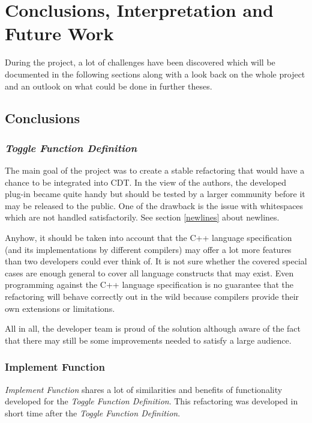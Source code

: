 \chapter{Conclusions, Interpretation and Future Work}
\thispagestyle{fancy}

During the project, a lot of challenges have been discovered which will be 
documented in the following sections along with a look back on the whole project 
and an outlook on what could be done in further theses. 

\section{Conclusions}

\subsection{\textit{Toggle Function Definition}}
The main goal of the project was to create a stable refactoring that would have 
a chance to be integrated into CDT. In the view of the authors, the developed 
plug-in became quite handy but should be tested by a larger community before it 
may be released to the public. One of the drawback is the issue with
whitespaces which are not handled satisfactorily. See section \ref{newlines}
about newlines.

Anyhow, it should be taken into account that the C++ language specification (and 
its implementations by different compilers) may offer a lot more features 
than two developers could ever think of. It is not sure whether the covered
special cases are enough general to cover all language constructs that may
exist. Even programming against the C++ language specification is no guarantee
that the refactoring will behave correctly out in the wild because compilers
provide their own extensions or limitations.

All in all, the developer team is proud of the solution although aware of the 
fact that there may still be some improvements needed to satisfy a large 
audience.

\subsection{Implement Function}
\textit{Implement Function} shares a lot of similarities and benefits of
functionality developed for the \textit{Toggle Function Definition}. This
refactoring was developed in short time after the \textit{Toggle Function
Definition}.

